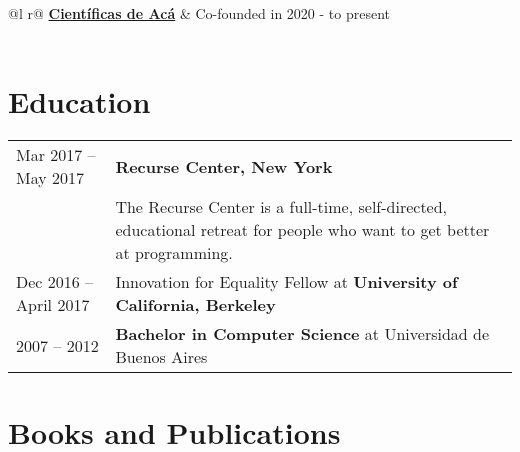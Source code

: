 \documentclass[a4paper,12pt]{article}
\begin{document}
\begin{tabularx}{\linewidth}{ @{}l r@{} }
\textbf{\href{https://www.cientificasdeaca.com/}{Científicas de Acá}} & \hfill Co-founded in 2020 - to present \\[3.75pt]
  \\
\end{tabularx}
\section{Education}
\begin{tabularx}{\linewidth}{@{}l X@{}} 

Mar 2017 – May 2017 &  \textbf{Recurse Center, New York} \hfill  \\

& The Recurse Center is a full-time, self-directed, educational retreat for people who want to get better at programming. \\

Dec 2016 – April 2017 & Innovation for Equality Fellow at \textbf{University of California, Berkeley} \hfill \\ 

2007 – 2012 & \textbf{Bachelor in Computer Science} at Universidad de Buenos Aires \hfill  \\

\end{tabularx}

\section{Books and Publications}
\end{document}
